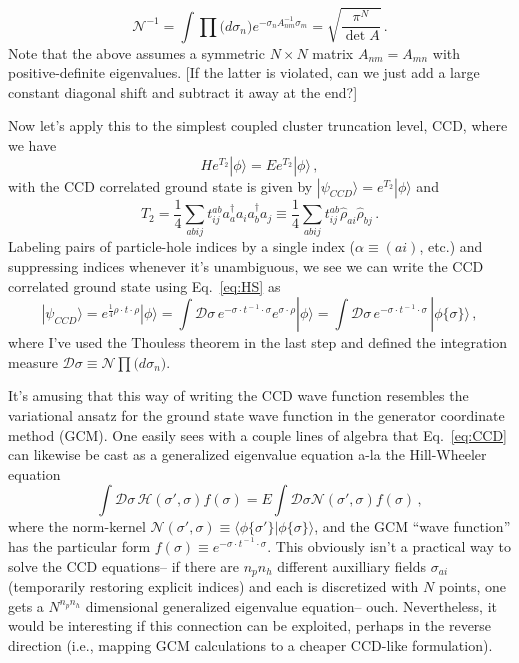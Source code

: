 \documentclass[12pt]{article}
\begin{document}
\begin{equation}
\mathcal{N}^{-1} = \int \prod\bigl(d\sigma_n\bigr) e^{-\sigma_n A^{-1}_{nm}\sigma_m}  = \sqrt{\frac{\pi^{N}}{\det{A} }}\,.
\end{equation}
Note that the above assumes a symmetric $N\times N$ matrix $A_{nm}=A_{mn}$ with positive-definite eigenvalues. [If the latter is violated, can we just add a large constant diagonal shift and subtract it away at the end?] 

Now let's apply this to the simplest coupled cluster truncation level, CCD, where we have
\begin{equation}
\label{eq:CCD}
He^{T_2}|\phi\rangle = Ee^{T_2}|\phi\rangle\,,
\end{equation}
with the CCD correlated ground state is given by $|\psi_{CCD}\rangle = e^{T_2}|\phi\rangle$ and
\begin{equation}
T_2 = \frac{1}{4}\sum_{abij}t^{ab}_{ij}a^{\dagger}_aa_ia^{\dagger}_ba_j\equiv \frac{1}{4}\sum_{abij}t^{ab}_{ij}\hat{\rho}_{ai}\hat{\rho}_{bj}\,.
\end{equation}
Labeling pairs of particle-hole indices by a single index ($\alpha\equiv(ai)$, etc.) and suppressing indices whenever it's unambiguous, we see we can write the CCD correlated ground state using Eq.~\ref{eq:HS} as 
\begin{equation}
|\psi_{CCD}\rangle = e^{\frac{1}{4}\rho\cdot t\cdot\rho}|\phi\rangle=\int \mathcal{D}\sigma \,e^{-\sigma\cdot t^{\!-1}\!\cdot\sigma} e^{\sigma\cdot\rho}|\phi\rangle = \int \mathcal{D}\sigma \,e^{-\sigma\cdot t^{\!-1}\!\cdot\sigma}\,|\phi\{\sigma\}\rangle\,, 
\end{equation}
where I've used the Thouless theorem in the last step and defined the integration measure $\mathcal{D}\sigma \equiv \mathcal{N}\prod\bigl(d\sigma_n\bigr)$. 

It's amusing that this way of writing the CCD wave function resembles the variational ansatz for the ground state wave function in the generator coordinate method (GCM). One easily sees with a couple lines of algebra that Eq.~\ref{eq:CCD} can likewise be cast as a generalized eigenvalue equation a-la the Hill-Wheeler equation
\begin{equation}
\int \mathcal{D}\sigma\, \mathcal{H}(\sigma',\sigma)f(\sigma) = E \int\mathcal{D}\sigma \mathcal{N}(\sigma',\sigma)f(\sigma)\,,
\end{equation}
where the norm-kernel $\mathcal{N}(\sigma',\sigma) \equiv \langle\phi\{\sigma'\}|\phi\{\sigma\}\rangle$, and the GCM ``wave function'' has the particular form $f(\sigma)\equiv e^{-\sigma\cdot t^{\!-1}\!\cdot\sigma}$.  This obviously isn't a practical way to solve the CCD equations-- if there are $n_pn_h$ different auxilliary fields $\sigma_{ai}$ (temporarily restoring explicit indices) and each is discretized with $N$ points, one gets a $N^{n_pn_h}$ dimensional generalized eigenvalue equation-- ouch. Nevertheless, it would be interesting if this connection can be exploited, perhaps in the reverse direction (i.e., mapping GCM calculations to a cheaper CCD-like formulation). 
\end{document}
